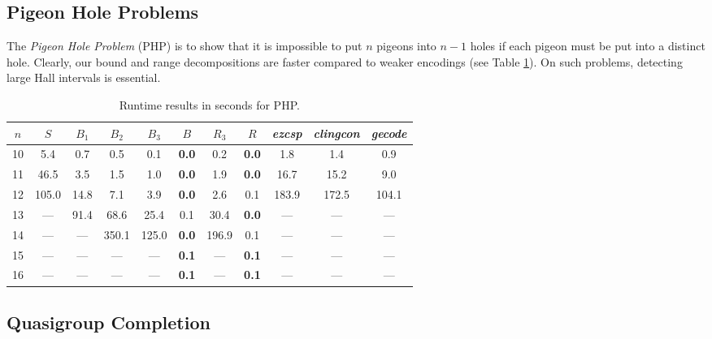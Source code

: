 \documentclass{tlp}
\newcommand{\systemname}[1]{\emph{#1}}
\newcommand{\encsup}{$S$}
\newcommand{\encbou}{$B$}
\newcommand{\encran}{$R$}
\newcommand{\encbouh}[1]{\encbou$_{#1}$}
\newcommand{\encranh}[1]{\encran$_{#1}$}
\begin{document}
\subsection{Pigeon Hole Problems}

The \emph{Pigeon Hole Problem} (PHP) is to show that it is impossible to put $n$ pigeons into $n-1$ holes if each pigeon must be put into a distinct hole.
Clearly, our bound and range decompositions are faster compared to weaker encodings (see Table \ref{tab:php}). On such problems, detecting large Hall intervals is essential.
\begin{table}
\caption{Runtime results in seconds for PHP.}
\label{tab:php}
\begin{minipage}{\textwidth}
\begin{tabular}{ccccccccccc} \hline\hline
$n$ & \encsup & \encbouh{1} & \encbouh{2} & \encbouh{3} & \encbou & \encranh{3} & \encran & \systemname{ezcsp} & \systemname{clingcon} & \systemname{gecode} \\ \hline
10 & 5.4 & 0.7 & 0.5 & 0.1 & \textbf{0.0} & 0.2 & \textbf{0.0} & 1.8 & 1.4 & 0.9 \\
11 & 46.5 & 3.5 & 1.5 & 1.0 & \textbf{0.0} & 1.9 & \textbf{0.0} & 16.7 & 15.2 & 9.0 \\
12 & 105.0 & 14.8 & 7.1 & 3.9 & \textbf{0.0} & 2.6 & 0.1 & 183.9 & 172.5 & 104.1 \\
13 & --- & 91.4 & 68.6 & 25.4 & 0.1 & 30.4 & \textbf{0.0} & --- & --- & --- \\
14 & --- & --- & 350.1 & 125.0 & \textbf{0.0} & 196.9 & 0.1 & --- & --- & --- \\
15 & --- & --- & --- & --- & \textbf{0.1} & --- & \textbf{0.1} & --- & --- & --- \\
16 & --- & --- & --- & --- & \textbf{0.1} & --- & \textbf{0.1} & --- & --- & --- \\ \hline\hline
\end{tabular}
\vspace{-2\baselineskip}
\end{minipage}
\end{table}


\subsection{Quasigroup Completion}
\end{document}
